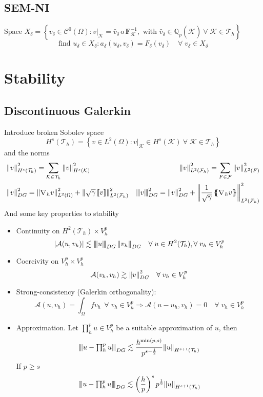 \documentclass[a4paper,11pt]{article}
\theoremstyle{break}
\renewcommand*{\grad}{\nabla\mspace{1mu}}
\newcommand{\vect}[1]{\textbf{#1}}
\newcommand*{\txt}[1]{\text{#1}}
\newcommand*{\limited}[1]{\vert_{#1}}
\newcommand*{\threenorm}[3][\null]{\left\lvert\mspace{-2mu}\left\lvert\mspace{-2mu}\left\lvert#2\right\rvert\mspace{-2mu}\right\rvert\mspace{-2mu}\right\rvert_{#3}^{#1}}
\newcommand{\ltwonorm}[1]{\norm{#1}_{L^2(\Omega)}}
\newcommand{\jump}[1]{\left[\!\left[#1\right]\!\right]}
\newcommand{\average}[1]{\left\{\mspace{-6.5mu}\left\{#1\right\}\mspace{-6.5mu}\right\}}
\newcommand{\element}{\mathcal{K}}
\newcommand{\triangulation}{\mathcal{T}_h}
\newcommand{\eit}{{\element\in\triangulation}}
\newcommand{\find}{\txt{find }}
\numberwithin{equation}{section}
\begin{document}
\subsection*{SEM-NI}
Space \(X_\delta= \left\{ v_\delta \in \mathcal{C}^0(\Omega) : v\limited{\element} = \hat{v}_\delta \, \mathrm{o}\, \vect{F}^{-1}_\element, \txt{ with } \hat{v}_\delta \in \mathbb{Q}_p(\hat{\element}) \ \forall \; \eit \right\}\)
\[
    \find u_\delta \in X_\delta : a_\delta(u_\delta, v_\delta) = F_\delta(v_\delta) \quad \forall \; v_\delta \in X_\delta
\]
\section*{Stability}
\subsection*{Discontinuous Galerkin}
Introduce broken Sobolev space
\[
    H^s(\triangulation) = \left\{ v \in L^2(\Omega) : v\limited{\element} \in H^s(\element) \ \forall \; \eit \right\}
\]
and the norms 
\begin{align*}
    &\norm{v}^2_{H^s(\triangulation)} = \sum_{\eit} \norm{v}^2_{H^s(\element)} &\norm{v}^2_{L^2(\mathcal{F}_h)} = \sum_{F \in \mathcal{F}} \norm{v}^2_{L^2(F)} \\ 
    &\norm{v}^2_{DG} = \ltwonorm{\grad_h v}^2 + \norm{\sqrt{\gamma}\jump{v}}^2_{L^2(\mathcal{F}_h)} &\threenorm[2]{v}{DG} = \norm{v}^2_{DG} + \norm{\frac{1}{\sqrt{\gamma}} \average{\grad_h v}}^2_{L^2(\mathcal{F}_h)}
\end{align*}
And some key properties to stability
\begin{itemize}
    \item Continuity on \(H^2(\triangulation) \times V_h^p\)
    \[
        \abs{\mathcal{A}(u, v_h)} \lesssim \threenorm{u}{DG} \norm{v_h}_{DG} \quad \forall \; u \in H^2(\triangulation), \forall \; v_h \in V_h^p 
    \]
    \item Coercivity on \(V_h^p \times V_h^p\) 
    \[
        \mathcal{A}(v_h, v_h) \gtrsim \norm{v}^2_{DG} \quad \forall \; v_h \in V_h^p
    \]
    \item  Strong-consistency (Galerkin orthogonality):
    \[
        \mathcal{A}(u,v_h) = \int_\Omega f v_h \ \ \forall \; v_h \in V_h^p \Rightarrow \mathcal{A}(u-u_h, v_h) = 0 \quad \forall \; v_h \in V_h^p
    \]
    \item Approximation. Let \(\prod_{h}^{p}u \in V_h^p\) be a suitable approximation of \(u\), then 
    \[
        \threenorm{u-{\textstyle \prod_{h}^{p}u}}{DG} \lesssim \frac{h^{\min(p,s)}}{p^{s-\frac{1}{2}}}\norm{u}_{H^{s+1}(\triangulation)}
    \]
    If \(p \geq s\)
    \[
        \threenorm{u-{\textstyle \prod_{h}^{p}u}}{DG} \lesssim \left( \frac{h}{p} \right)^s p^{\frac{1}{2}}\norm{u}_{H^{s+1}(\triangulation)}
    \]
\end{itemize}
\end{document}
